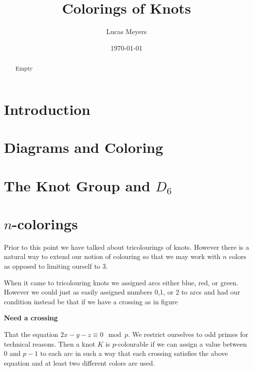 \documentclass[12pt]{amsart}
\theoremstyle{definition}
\theoremstyle{remark}
\numberwithin{equation}{section}
\begin{document}
\title{Colorings of Knots}


\author{Lucas Meyers}
\address{Mathematics Department\\
Louisiana State University\\
Baton Rouge, Louisiana}

\date{\today}

\begin{abstract}
  Empty
\end{abstract}



\maketitle

\section{Introduction}
\label{introduction}

\section{Diagrams and Coloring}
\label{sec:diagrams-coloring}

\section{The Knot Group and $D_6$}
\label{sec:knot-group-d_6}



\section{$n$-colorings}
\label{sec:n-colorings}

Prior to this point we have talked about tricolourings
of knots. However there is a natural way to extend
our notion of colouring so that we may work with $n$
colors as opposed to limiting ourself to 3.

When it came to tricolouring knots we assigned arcs
either blue, red, or green. However we could just as
easily assigned numbers 0,1, or 2 to arcs and had
our condition instead be that if we have a crossing
as in figure

\textbf{Need a crossing}

That the equation $2x-y-z\equiv 0 \mod p$. We restrict
ourselves to odd primes for technical reasons.
Then a knot $K$ is $p$-colourable if we can assign
a value between $0$ and $p-1$ to each arc in such a
way that each crossing satisfies the above equation and
at least two different colors are used.
\end{document}
